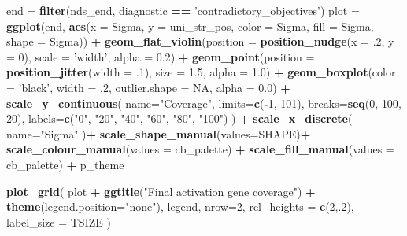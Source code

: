 \documentclass[]{book}
\newenvironment{Shaded}{\begin{snugshade}}{\end{snugshade}}
\newcommand{\DataTypeTok}[1]{\textcolor[rgb]{0.13,0.29,0.53}{#1}}
\newcommand{\DecValTok}[1]{\textcolor[rgb]{0.00,0.00,0.81}{#1}}
\newcommand{\FloatTok}[1]{\textcolor[rgb]{0.00,0.00,0.81}{#1}}
\newcommand{\KeywordTok}[1]{\textcolor[rgb]{0.13,0.29,0.53}{\textbf{#1}}}
\newcommand{\NormalTok}[1]{#1}
\newcommand{\OperatorTok}[1]{\textcolor[rgb]{0.81,0.36,0.00}{\textbf{#1}}}
\newcommand{\OtherTok}[1]{\textcolor[rgb]{0.56,0.35,0.01}{#1}}
\newcommand{\StringTok}[1]{\textcolor[rgb]{0.31,0.60,0.02}{#1}}
\begin{document}
\begin{Shaded}
\begin{Highlighting}[]
\NormalTok{end =}\StringTok{ }\KeywordTok{filter}\NormalTok{(nds_end, diagnostic }\OperatorTok{==}\StringTok{ 'contradictory_objectives'}\NormalTok{)}
\NormalTok{plot =}\StringTok{ }\KeywordTok{ggplot}\NormalTok{(end, }\KeywordTok{aes}\NormalTok{(}\DataTypeTok{x =}\NormalTok{ Sigma, }\DataTypeTok{y =}\NormalTok{ uni_str_pos, }\DataTypeTok{color =}\NormalTok{ Sigma, }\DataTypeTok{fill =}\NormalTok{ Sigma, }\DataTypeTok{shape =}\NormalTok{ Sigma)) }\OperatorTok{+}
\StringTok{  }\KeywordTok{geom_flat_violin}\NormalTok{(}\DataTypeTok{position =} \KeywordTok{position_nudge}\NormalTok{(}\DataTypeTok{x =} \FloatTok{.2}\NormalTok{, }\DataTypeTok{y =} \DecValTok{0}\NormalTok{), }\DataTypeTok{scale =} \StringTok{'width'}\NormalTok{, }\DataTypeTok{alpha =} \FloatTok{0.2}\NormalTok{) }\OperatorTok{+}
\StringTok{  }\KeywordTok{geom_point}\NormalTok{(}\DataTypeTok{position =} \KeywordTok{position_jitter}\NormalTok{(}\DataTypeTok{width =} \FloatTok{.1}\NormalTok{), }\DataTypeTok{size =} \FloatTok{1.5}\NormalTok{, }\DataTypeTok{alpha =} \FloatTok{1.0}\NormalTok{) }\OperatorTok{+}
\StringTok{  }\KeywordTok{geom_boxplot}\NormalTok{(}\DataTypeTok{color =} \StringTok{'black'}\NormalTok{, }\DataTypeTok{width =} \FloatTok{.2}\NormalTok{, }\DataTypeTok{outlier.shape =} \OtherTok{NA}\NormalTok{, }\DataTypeTok{alpha =} \FloatTok{0.0}\NormalTok{) }\OperatorTok{+}
\StringTok{  }\KeywordTok{scale_y_continuous}\NormalTok{(}
    \DataTypeTok{name=}\StringTok{"Coverage"}\NormalTok{,}
    \DataTypeTok{limits=}\KeywordTok{c}\NormalTok{(}\OperatorTok{-}\DecValTok{1}\NormalTok{, }\DecValTok{101}\NormalTok{),}
    \DataTypeTok{breaks=}\KeywordTok{seq}\NormalTok{(}\DecValTok{0}\NormalTok{, }\DecValTok{100}\NormalTok{, }\DecValTok{20}\NormalTok{),}
    \DataTypeTok{labels=}\KeywordTok{c}\NormalTok{(}\StringTok{"0"}\NormalTok{, }\StringTok{"20"}\NormalTok{, }\StringTok{"40"}\NormalTok{, }\StringTok{"60"}\NormalTok{, }\StringTok{"80"}\NormalTok{, }\StringTok{"100"}\NormalTok{)}
\NormalTok{  ) }\OperatorTok{+}
\StringTok{  }\KeywordTok{scale_x_discrete}\NormalTok{(}
    \DataTypeTok{name=}\StringTok{"Sigma"}
\NormalTok{  )}\OperatorTok{+}
\StringTok{  }\KeywordTok{scale_shape_manual}\NormalTok{(}\DataTypeTok{values=}\NormalTok{SHAPE)}\OperatorTok{+}
\StringTok{  }\KeywordTok{scale_colour_manual}\NormalTok{(}\DataTypeTok{values =}\NormalTok{ cb_palette) }\OperatorTok{+}
\StringTok{  }\KeywordTok{scale_fill_manual}\NormalTok{(}\DataTypeTok{values =}\NormalTok{ cb_palette) }\OperatorTok{+}
\StringTok{  }\NormalTok{p_theme}

\KeywordTok{plot_grid}\NormalTok{(}
\NormalTok{  plot }\OperatorTok{+}
\StringTok{    }\KeywordTok{ggtitle}\NormalTok{(}\StringTok{"Final activation gene coverage"}\NormalTok{) }\OperatorTok{+}
\StringTok{    }\KeywordTok{theme}\NormalTok{(}\DataTypeTok{legend.position=}\StringTok{"none"}\NormalTok{),}
\NormalTok{  legend,}
  \DataTypeTok{nrow=}\DecValTok{2}\NormalTok{,}
  \DataTypeTok{rel_heights =} \KeywordTok{c}\NormalTok{(}\DecValTok{2}\NormalTok{,.}\DecValTok{2}\NormalTok{),}
  \DataTypeTok{label_size =}\NormalTok{ TSIZE}
\NormalTok{)}
\end{Highlighting}
\end{Shaded}
\end{document}
